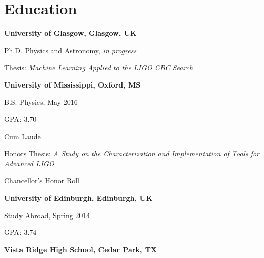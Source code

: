 \section{\sc Education}

{\bf University of Glasgow, Glasgow, UK}\\
\vspace*{-.1in}
\begin{list1}
\item[] Ph.D. Physics and Astronomy, \emph{in progress}
\end{list1}
\begin{list2}
\vspace*{.05in}
\item Thesis: \emph{Machine Learning Applied to the LIGO CBC Search}
\end{list2}

{\bf University of Mississippi, Oxford, MS}\\
\vspace*{-.1in}
\begin{list1}
\item[] B.S. Physics, May 2016
\item[] GPA: 3.70
\end{list1}
\begin{list2}
\vspace*{.05in}
\item Cum Laude
\item Honors Thesis: \emph{A Study on the Characterization and Implementation of Tools for Advanced LIGO}
\item Chancellor's Honor Roll
\end{list2}

{\bf University of Edinburgh, Edinburgh, UK}\\
\vspace*{-.1in}
\begin{list1}
\item[] Study Abroad, Spring 2014 
\end{list1}
\begin{list2}
\item GPA: 3.74
\end{list2}

{\bf Vista Ridge High School, Cedar Park, TX}

\endinput